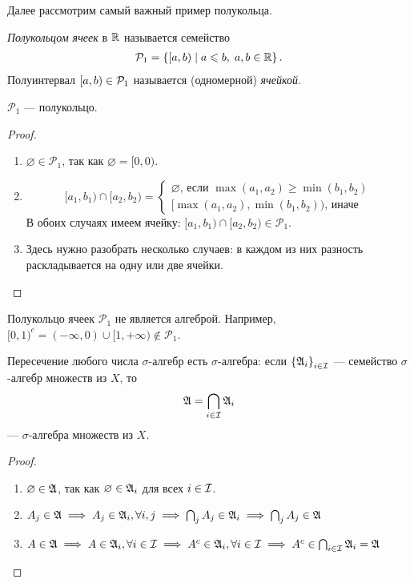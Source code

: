Далее рассмотрим самый важный пример полукольца.

\begin{df}
 \textit{Полукольцом ячеек} в $\mathbb{R}$ называется семейство 
\begin{align*}
 \mathcal{P}_1 = \left\{ [a, b) \mid a \leqslant b,\; a, b \in \mathbb{R} \right\} 
.\end{align*} Полуинтервал $[a, b) \in \mathcal{P}_1$ называется (одномерной) \textit{ячейкой}.
\end{df}
\begin{lm}
 $ \mathcal{P}_1 $ --- полукольцо.
\end{lm}
\begin{proof}\
 \begin{enumerate}
  \item $ \varnothing \in \mathcal{P}_1 $, так как $ \varnothing = [0, 0) $.
  \item $$
   [a_1, b_1) \cap [a_2, b_2) = 
   \begin{cases}
    \varnothing \text{, если } \max(a_1, a_2) \geqslant \min(b_1, b_2) \\
    [\max(a_1, a_2), \min(b_1, b_2) ) \text{, иначе}
   \end{cases}
   $$
   В обоих случаях имеем ячейку: $[a_1, b_1) \cap [a_2, b_2) \in \mathcal{P}_1 $.
  \item Здесь нужно разобрать несколько случаев: в каждом из них разность раскладывается на одну или две ячейки.
 \end{enumerate}
\end{proof}
\begin{remrk*}
Полукольцо ячеек $ \mathcal{P}_1 $ не является алгеброй.
Например, $ [0, 1)^c = (-\infty, 0) \cup [1, +\infty) \not \in  \mathcal{P}_1 $.
\end{remrk*}
\begin{lm}
 Пересечение любого числа $\sigma$-алгебр есть $\sigma$-алгебра: если $\left\{\mathfrak{A}_i\right\}_{i \in \mathcal{I}}$  --- семейство $\sigma$-алгебр множеств из $X$, то
 \begin{align*}
  \mathfrak{A} = \bigcap_{i \in \mathcal{I}} \mathfrak{A}_i
 \end{align*} --- $\sigma$-алгебра множеств из $X$.
\end{lm}
\begin{proof}\
 \begin{enumerate}
  \item $ \varnothing \in \mathfrak{A} $, так как $ \varnothing \in \mathfrak{A}_i $ для всех $ i \in \mathcal{I} $.
  \item $ A_j \in \mathfrak{A} \;\Longrightarrow\; A_j \in \mathfrak{A}_i, \forall i, j  \;\Longrightarrow\; \bigcap_j A_j \in 
  \mathfrak{A}_i \;\Longrightarrow\; \bigcap_j A_j \in \mathfrak{A}$
  \item $ A \in \mathfrak{A} \;\Longrightarrow\; A \in \mathfrak{A}_i,  \forall i \in \mathcal{I} \;\Longrightarrow\; A^c \in \mathfrak{A}_i, \forall i \in \mathcal{I} \;\Longrightarrow\; A^c \in \bigcap_{i \in \mathcal{I}} \mathfrak{A}_i = \mathfrak{A}$ 
 \end{enumerate}
\end{proof}
